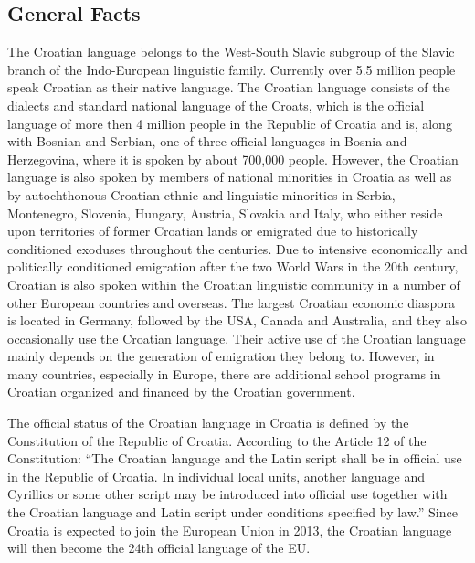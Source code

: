 \begin{multicols}{2}

\subsection{General Facts}

The Croatian language belongs to the West-South Slavic subgroup of the Slavic branch of the Indo-European linguistic family. Currently over 5.5 million people speak Croatian as their native language. The Croatian language consists of the dialects and standard national language of the Croats, which is the official language of more then 4 million people in the Republic of Croatia and is, along with Bosnian and Serbian, one of three official languages in Bosnia and Herzegovina, where it is spoken by about 700,000 people. However, the Croatian language is also spoken by members of national minorities in Croatia as well as by autochthonous Croatian ethnic and linguistic minorities in Serbia, Montenegro, Slovenia, Hungary, Austria, Slovakia and Italy, who either reside upon territories of former Croatian lands or emigrated due to historically conditioned exoduses throughout the centuries. Due to intensive economically and politically conditioned emigration after the two World Wars in the 20th century, Croatian is also spoken within the Croatian linguistic community in a number of other European countries and overseas. The largest Croatian economic diaspora is located in Germany, followed by the USA, Canada and Australia, and they also occasionally use the Croatian language. Their active use of the Croatian language mainly depends on the generation of emigration they belong to. However, in many countries, especially in Europe, there are additional school programs in Croatian organized and financed by the Croatian government.   

The official status of the Croatian language in Croatia is defined by the Constitution of the Republic of Croatia. According to the Article 12 of the Constitution: “The Croatian language and the Latin script shall be in official use in the Republic of Croatia. In individual local units, another language and Cyrillics or some other script may be introduced into official use together with the Croatian language and Latin script under conditions specified by law.” Since Croatia is expected to join the European Union in 2013, the Croatian language will then become the 24th official language of the EU. 


\end{multicols}

